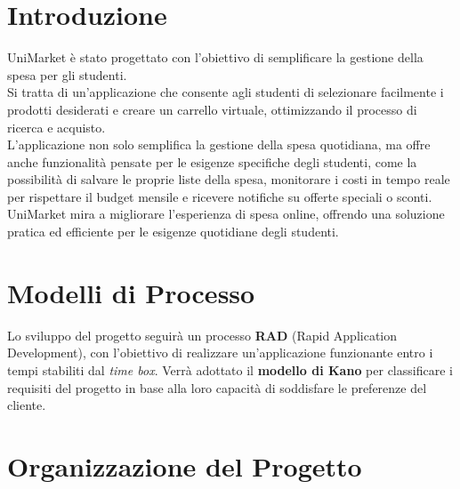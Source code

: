 \documentclass[a4paper,12pt]{article}
\begin{document}
\section{Introduzione} %
UniMarket è stato progettato con l'obiettivo di semplificare la gestione della spesa per gli studenti.\\  
Si tratta di un'applicazione che consente agli studenti di selezionare facilmente i prodotti desiderati e creare un carrello virtuale, ottimizzando il processo di ricerca e acquisto. \\
L'applicazione non solo semplifica la gestione della spesa quotidiana, ma offre anche funzionalità pensate per le esigenze specifiche degli studenti, come la possibilità di salvare le proprie liste della spesa, monitorare i costi in tempo reale per rispettare il budget mensile e ricevere notifiche su offerte speciali o sconti. \\
UniMarket mira a migliorare l'esperienza di spesa online, offrendo una soluzione pratica ed efficiente per le esigenze quotidiane degli studenti.

\section{Modelli di Processo} %
Lo sviluppo del progetto seguirà un processo \textbf{RAD} (Rapid Application Development), con l’obiettivo di realizzare un’applicazione funzionante entro i tempi stabiliti dal \textit{time box}.  
Verrà adottato il \textbf{modello di Kano} per classificare i requisiti del progetto in base alla loro capacità di soddisfare le preferenze del cliente.


\section{Organizzazione del Progetto} %
\end{document}
